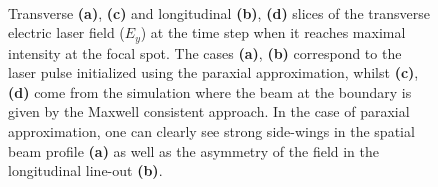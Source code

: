 \begin{figure}[h!]
	\centering
	\hspace{2mm}
	\\
	\hspace{2mm}
	\caption{Transverse \textbf{(a)}, \textbf{(c)} and longitudinal \textbf{(b)}, \textbf{(d)} slices of the transverse electric laser field ($ E_{y} $) at the time step when it reaches maximal intensity at the focal spot. The cases \textbf{(a)}, \textbf{(b)} correspond to the laser pulse initialized using the paraxial approximation, whilst \textbf{(c)}, \textbf{(d)} come from the simulation where the beam at the boundary is given by the Maxwell consistent approach. In the case of paraxial approximation, one can clearly see strong side-wings in the spatial beam profile \textbf{(a)} as well as the asymmetry of the field in the longitudinal line-out \textbf{(b)}.}
	\label{fig:2}
\end{figure}

